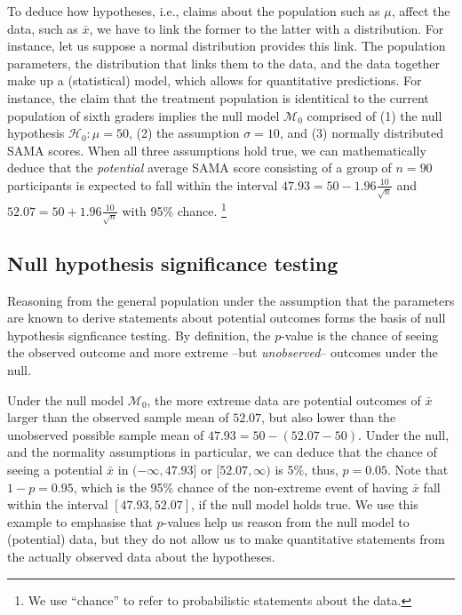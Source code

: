 \documentclass[english,,doc,floatsintext]{apa6}
\let\rmarkdownfootnote\footnote%
\def\footnote{\protect\rmarkdownfootnote}
\begin{document}
To deduce how hypotheses, i.e., claims about the population such as \(\mu\), affect the data, such as \(\bar{x}\), we have to link the former to the latter with a distribution. For instance, let us suppose a normal distribution provides this link. The population parameters, the distribution that links them to the data, and the data together make up a (statistical) model, which allows for quantitative predictions. For instance, the claim that the treatment population is identitical to the current population of sixth graders implies the null model \(\mathcal{M}_{0}\) comprised of (1) the null hypothesis \(\mathcal{H}_{0}: \mu = 50\), (2) the assumption \(\sigma = 10\), and (3) normally distributed SAMA scores. When all three assumptions hold true, we can mathematically deduce that the \emph{potential} average SAMA score consisting of a group of \(n = 90\) participants is expected to fall within the interval \(47.93 = 50 - 1.96 \frac{10}{\sqrt{n}}\) and \(52.07 = 50 + 1.96 \frac{10}{\sqrt{n}}\) with 95\% chance.
\footnote{We use ``chance'' to refer to probabilistic statements about the data.}

\subsection{Null hypothesis significance testing}

Reasoning from the general population under the assumption that the parameters are known to derive statements about potential outcomes forms the basis of null hypothesis signficance testing. By definition, the \(p\)-value is the chance of seeing the observed outcome and more extreme --but \emph{unobserved}-- outcomes under the null.

Under the null model \(\mathcal{M}_{0}\), the more extreme data are potential outcomes of \(\bar{x}\) larger than the observed sample mean of \(52.07\), but also lower than the unobserved possible sample mean of \(47.93 = 50 - (52.07-50)\). Under the null, and the normality assumptions in particular, we can deduce that the chance of seeing a potential \(\bar{x}\) in \((- \infty, 47.93]\) or \([52.07, \infty)\) is 5\%, thus, \(p=0.05\). Note that \(1 - p = 0.95\), which is the 95\% chance of the non-extreme event of having \(\bar{x}\) fall within the interval \([47.93, 52.07]\), if the null model holds true. We use this example to emphasise that \(p\)-values help us reason from the null model to (potential) data, but they do not allow us to make quantitative statements from the actually observed data about the hypotheses.
\end{document}
